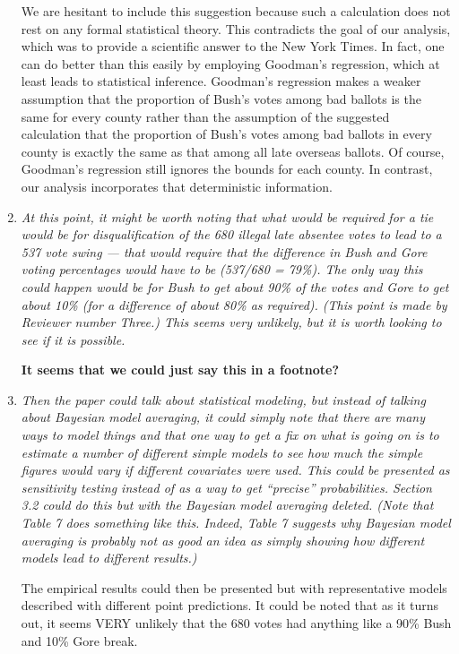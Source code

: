 \documentclass[11pt]{article}
\begin{document}
\begin{enumerate}
  We are hesitant to include this suggestion because such a
  calculation does not rest on any formal statistical theory. This
  contradicts the goal of our analysis, which was to provide a
  scientific answer to the New York Times. In fact, one can do better
  than this easily by employing Goodman's regression, which at least
  leads to statistical inference. Goodman's regression makes a weaker
  assumption that the proportion of Bush's votes among bad ballots is
  the same for every county rather than the assumption of the
  suggested calculation that the proportion of Bush's votes among bad
  ballots in every county is exactly the same as that among all late
  overseas ballots. Of course, Goodman's regression still ignores the
  bounds for each county. In contrast, our analysis incorporates that
  deterministic information.
  
\item {\it At this point, it might be worth noting that what would be
    required for a tie would be for disqualification of the 680
    illegal late absentee votes to lead to a 537 vote swing --- that
    would require that the difference in Bush and Gore voting
    percentages would have to be (537/680 = 79\%).  The only way this
    could happen would be for Bush to get about 90\% of the votes and
    Gore to get about 10\% (for a difference of about 80\% as
    required).  (This point is made by Reviewer number Three.)  This
    seems very unlikely, but it is worth looking to see if it is
    possible. }
  
  {\bf It seems that we could just say this in a footnote?}
  
\item {\it Then the paper could talk about statistical modeling, but
    instead of talking about Bayesian model averaging, it could simply
    note that there are many ways to model things and that one way to
    get a fix on what is going on is to estimate a number of different
    simple models to see how much the simple figures would vary if
    different covariates were used.  This could be presented as
    sensitivity testing instead of as a way to get ``precise''
    probabilities.  Section 3.2 could do this but with the Bayesian
    model averaging deleted.  (Note that Table 7 does something like
    this.  Indeed, Table 7 suggests why Bayesian model averaging is
    probably not as good an idea as simply showing how different
    models lead to different results.) 
    
    The empirical results could then be presented but with
    representative models described with different point predictions.
    It could be noted that as it turns out, it seems VERY unlikely
    that the 680 votes had anything like a 90\% Bush and 10\% Gore
    break.
  
}
\end{enumerate}
\end{document}
